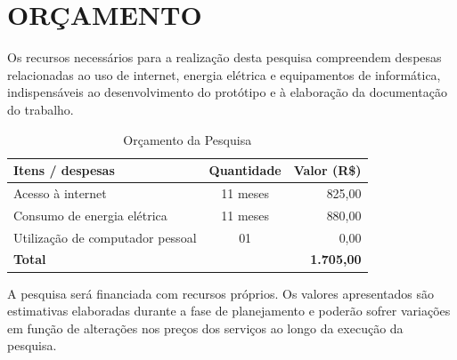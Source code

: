 \chapter{ORÇAMENTO} \label{cha:orcamento}

Os recursos necessários para a realização desta pesquisa compreendem despesas relacionadas ao uso de internet, energia elétrica e equipamentos de informática, indispensáveis ao desenvolvimento do protótipo e à elaboração da documentação do trabalho.

\begin{table}[H]
    \caption{Orçamento da Pesquisa}
    \centering
    \begin{tabular}{|p{7cm}|c|r|}
        \hline
        \textbf{Itens / despesas} & \textbf{Quantidade} & \textbf{Valor (R\$)} \\ \hline
        Acesso à internet & 11 meses & 825,00 \\ \hline
        Consumo de energia elétrica & 11 meses & 880,00 \\ \hline
        Utilização de computador pessoal & 01 & 0,00 \\ \hline
        \textbf{Total} & & \textbf{1.705,00} \\ \hline
    \end{tabular}
\end{table}

A pesquisa será financiada com recursos próprios. Os valores apresentados são estimativas elaboradas durante a fase de planejamento e poderão sofrer variações em função de alterações nos preços dos serviços ao longo da execução da pesquisa.